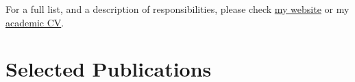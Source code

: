 \documentclass[11pt,a4paper,]{awesome-cv}
\begin{document}
For a full list, and a description of responsibilities, please check
\href{https://jdleongomez.info/en/profile/\#experience}{my website} or
my
\href{https://jdleongomez.github.io/JDL_CV/CV_eng/JDL_CV_en.pdf}{academic
CV}.

\begin{cventries}
    \vspace{-4.0mm}
\end{cventries}

\section{Selected Publications}\label{selected-publications}

\begin{tcolorbox}[enhanced,
  on line,
  boxsep=4pt, left=0pt,right=0pt,top=0pt,bottom=0pt,
  colframe=white,colback=teal,
  hyperurl={https://scholar.google.com/citations?user=8Q0jKHsAAAAJ}]


\end{tcolorbox}
\end{document}
